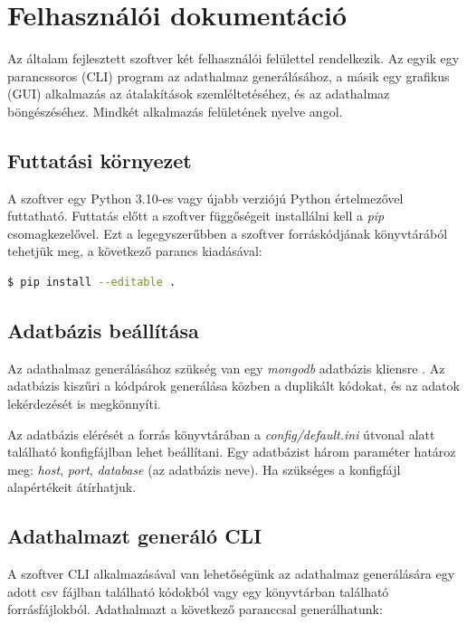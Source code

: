 \chapter{Felhasználói dokumentáció}
\label{ch:user}

Az általam fejlesztett szoftver két felhasználói felülettel rendelkezik.
Az egyik egy parancssoros (CLI) program az adathalmaz generálásához,
a másik egy grafikus (GUI) alkalmazás az átalakítások szemléltetéséhez,
és az adathalmaz böngészéséhez.
Mindkét alkalmazás felületének nyelve angol.

\section{Futtatási környezet}

A szoftver egy Python 3.10-es vagy újabb verziójú Python értelmezővel futtatható.
Futtatás előtt a szoftver függőségeit installálni kell a \emph{pip} csomagkezelővel.
Ezt a legegyszerűbben a szoftver forráskódjának könyvtárából tehetjük meg,
a következő parancs kiadásával:

\begin{lstlisting}[language=bash, numbers=none]
	$ pip install --editable .
\end{lstlisting}

\section{Adatbázis beállítása}

Az adathalmaz generálásához szükség van egy \emph{mongodb} adatbázis kliensre \cite{installMongodb}.
Az adatbázis kiszűri a kódpárok generálása közben a duplikált kódokat,
és az adatok lekérdezését is megkönnyíti.

Az adatbázis elérését a forrás könyvtárában a \emph{config/default.ini} útvonal alatt található
konfigfájlban lehet beállítani.
Egy adatbázist három paraméter határoz meg: \emph{host}, \emph{port}, \emph{database} (az adatbázis neve).
Ha szükséges a konfigfájl alapértékeit átírhatjuk.

\section{Adathalmazt generáló CLI}

A szoftver CLI alkalmazásával van lehetőségünk az adathalmaz generálására egy
adott csv fájlban található kódokból vagy egy könyvtárban található forrásfájlokból.
Adathalmazt a következő paranccsal generálhatunk:

